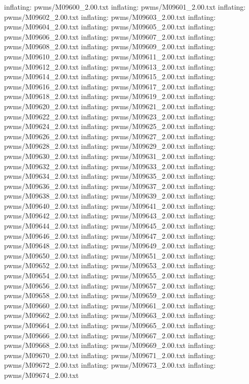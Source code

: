 \documentclass[letterpaper,10pt,english]{sphinxmanual}
\begin{document}
{\begin{sphinxVerbatim}[commandchars=\\\{\}]
  inflating: pwms/M09600\_2.00.txt
  inflating: pwms/M09601\_2.00.txt
  inflating: pwms/M09602\_2.00.txt
  inflating: pwms/M09603\_2.00.txt
  inflating: pwms/M09604\_2.00.txt
  inflating: pwms/M09605\_2.00.txt
  inflating: pwms/M09606\_2.00.txt
  inflating: pwms/M09607\_2.00.txt
  inflating: pwms/M09608\_2.00.txt
  inflating: pwms/M09609\_2.00.txt
  inflating: pwms/M09610\_2.00.txt
  inflating: pwms/M09611\_2.00.txt
  inflating: pwms/M09612\_2.00.txt
  inflating: pwms/M09613\_2.00.txt
  inflating: pwms/M09614\_2.00.txt
  inflating: pwms/M09615\_2.00.txt
  inflating: pwms/M09616\_2.00.txt
  inflating: pwms/M09617\_2.00.txt
  inflating: pwms/M09618\_2.00.txt
  inflating: pwms/M09619\_2.00.txt
  inflating: pwms/M09620\_2.00.txt
  inflating: pwms/M09621\_2.00.txt
  inflating: pwms/M09622\_2.00.txt
  inflating: pwms/M09623\_2.00.txt
  inflating: pwms/M09624\_2.00.txt
  inflating: pwms/M09625\_2.00.txt
  inflating: pwms/M09626\_2.00.txt
  inflating: pwms/M09627\_2.00.txt
  inflating: pwms/M09628\_2.00.txt
  inflating: pwms/M09629\_2.00.txt
  inflating: pwms/M09630\_2.00.txt
  inflating: pwms/M09631\_2.00.txt
  inflating: pwms/M09632\_2.00.txt
  inflating: pwms/M09633\_2.00.txt
  inflating: pwms/M09634\_2.00.txt
  inflating: pwms/M09635\_2.00.txt
  inflating: pwms/M09636\_2.00.txt
  inflating: pwms/M09637\_2.00.txt
  inflating: pwms/M09638\_2.00.txt
  inflating: pwms/M09639\_2.00.txt
  inflating: pwms/M09640\_2.00.txt
  inflating: pwms/M09641\_2.00.txt
  inflating: pwms/M09642\_2.00.txt
  inflating: pwms/M09643\_2.00.txt
  inflating: pwms/M09644\_2.00.txt
  inflating: pwms/M09645\_2.00.txt
  inflating: pwms/M09646\_2.00.txt
  inflating: pwms/M09647\_2.00.txt
  inflating: pwms/M09648\_2.00.txt
  inflating: pwms/M09649\_2.00.txt
  inflating: pwms/M09650\_2.00.txt
  inflating: pwms/M09651\_2.00.txt
  inflating: pwms/M09652\_2.00.txt
  inflating: pwms/M09653\_2.00.txt
  inflating: pwms/M09654\_2.00.txt
  inflating: pwms/M09655\_2.00.txt
  inflating: pwms/M09656\_2.00.txt
  inflating: pwms/M09657\_2.00.txt
  inflating: pwms/M09658\_2.00.txt
  inflating: pwms/M09659\_2.00.txt
  inflating: pwms/M09660\_2.00.txt
  inflating: pwms/M09661\_2.00.txt
  inflating: pwms/M09662\_2.00.txt
  inflating: pwms/M09663\_2.00.txt
  inflating: pwms/M09664\_2.00.txt
  inflating: pwms/M09665\_2.00.txt
  inflating: pwms/M09666\_2.00.txt
  inflating: pwms/M09667\_2.00.txt
  inflating: pwms/M09668\_2.00.txt
  inflating: pwms/M09669\_2.00.txt
  inflating: pwms/M09670\_2.00.txt
  inflating: pwms/M09671\_2.00.txt
  inflating: pwms/M09672\_2.00.txt
  inflating: pwms/M09673\_2.00.txt
  inflating: pwms/M09674\_2.00.txt

\end{sphinxVerbatim}}
\end{document}
